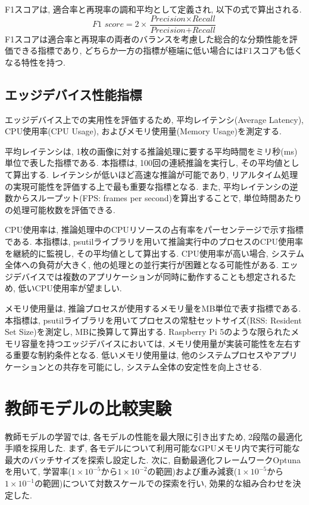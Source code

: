 F1スコアは, 適合率と再現率の調和平均として定義され, 以下の式で算出される.
\begin{equation}
\textit{F1 score} = 2 \times \frac{\textit{Precision} \times \textit{Recall}}{\textit{Precision} + \textit{Recall}}
\end{equation}
F1スコアは適合率と再現率の両者のバランスを考慮した総合的な分類性能を評価できる指標であり, どちらか一方の指標が極端に低い場合にはF1スコアも低くなる特性を持つ.

\subsection{エッジデバイス性能指標}
エッジデバイス上での実用性を評価するため, 平均レイテンシ(Average Latency), CPU使用率(CPU Usage), およびメモリ使用量(Memory Usage)を測定する.

平均レイテンシは, 1枚の画像に対する推論処理に要する平均時間をミリ秒(ms)単位で表した指標である.
本指標は, 100回の連続推論を実行し, その平均値として算出する.
レイテンシが低いほど高速な推論が可能であり, リアルタイム処理の実現可能性を評価する上で最も重要な指標となる.
また, 平均レイテンシの逆数からスループット(FPS: frames per second)を算出することで, 単位時間あたりの処理可能枚数を評価できる.

CPU使用率は, 推論処理中のCPUリソースの占有率をパーセンテージで示す指標である.
本指標は, psutilライブラリを用いて推論実行中のプロセスのCPU使用率を継続的に監視し, その平均値として算出する.
CPU使用率が高い場合, システム全体への負荷が大きく, 他の処理との並行実行が困難となる可能性がある.
エッジデバイスでは複数のアプリケーションが同時に動作することも想定されるため, 低いCPU使用率が望ましい.

メモリ使用量は, 推論プロセスが使用するメモリ量をMB単位で表す指標である.
本指標は, psutilライブラリを用いてプロセスの常駐セットサイズ(RSS: Resident Set Size)を測定し, MBに換算して算出する.
Raspberry Pi 5のような限られたメモリ容量を持つエッジデバイスにおいては, メモリ使用量が実装可能性を左右する重要な制約条件となる.
低いメモリ使用量は, 他のシステムプロセスやアプリケーションとの共存を可能にし, システム全体の安定性を向上させる.

\section{教師モデルの比較実験}
教師モデルの学習では, 各モデルの性能を最大限に引き出すため, 2段階の最適化手順を採用した.
まず, 各モデルについて利用可能なGPUメモリ内で実行可能な最大のバッチサイズを探索し設定した.
次に, 自動最適化フレームワークOptunaを用いて, 学習率($1 \times 10^{-5}$から$1 \times 10^{-2}$の範囲)および重み減衰($1 \times 10^{-5}$から$1 \times 10^{-1}$の範囲)について対数スケールでの探索を行い, 効果的な組み合わせを決定した.

